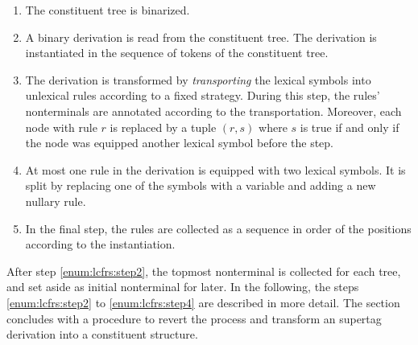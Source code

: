\documentclass[../../document.tex]{subfiles}
\begin{document}
    \begin{enumerate}
        \item The constituent tree is binarized.
        \item\label{enum:lcfrs:step2}
            A binary  derivation is read from the constituent tree.
            The derivation is instantiated in the sequence of tokens of the constituent tree.
        \item\label{enum:lcfrs:step3}
            The derivation is transformed by \emph{transporting} the lexical symbols into unlexical rules according to a fixed strategy.
            During this step, the rules' nonterminals are annotated according to the transportation.
            Moreover, each node with rule \(r\) is replaced by a tuple \((r, s)\) where \(s\) is true if and only if the node was equipped another lexical symbol before the step.
        \item\label{enum:lcfrs:step4}
            At most one rule in the derivation is equipped with two lexical symbols.
            It is split by replacing one of the symbols with a variable and adding a new nullary rule.
        \item
            In the final step, the rules are collected as a sequence in order of the positions according to the instantiation.
    \end{enumerate}
    After step \ref{enum:lcfrs:step2}, the topmost  nonterminal is collected for each tree, and set aside as initial nonterminal for later.
    In the following, the steps \ref{enum:lcfrs:step2} to \ref{enum:lcfrs:step4} are described in more detail.
    The section concludes with a procedure to revert the process and transform an  supertag derivation into a constituent structure.
\end{document}
